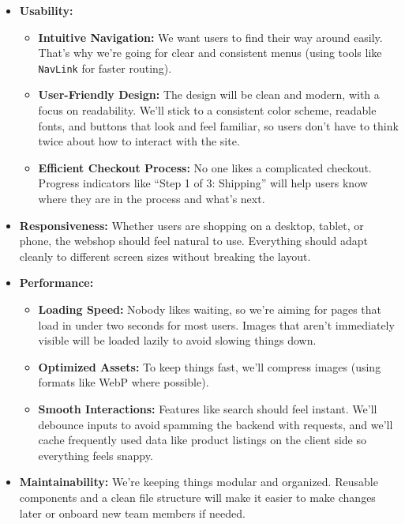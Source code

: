 \documentclass[a4paper,12pt]{article}
\begin{document}
\begin{itemize}
    \item \textbf{Usability:}  
    \begin{itemize}
        \item \textbf{Intuitive Navigation:}  
        We want users to find their way around easily. That’s why we’re going for clear and consistent menus (using tools like \texttt{NavLink} for faster routing).

        \item \textbf{User-Friendly Design:}  
        The design will be clean and modern, with a focus on readability. We’ll stick to a consistent color scheme, readable fonts, and buttons that look and feel familiar, so users don’t have to think twice about how to interact with the site.

        \item \textbf{Efficient Checkout Process:}  
        No one likes a complicated checkout. Progress indicators like “Step 1 of 3: Shipping” will help users know where they are in the process and what’s next.
    \end{itemize}

    \item \textbf{Responsiveness:}  
    Whether users are shopping on a desktop, tablet, or phone, the webshop should feel natural to use. Everything should adapt cleanly to different screen sizes without breaking the layout.

    \item \textbf{Performance:}  
    \begin{itemize}
        \item \textbf{Loading Speed:}  
        Nobody likes waiting, so we’re aiming for pages that load in under two seconds for most users. Images that aren’t immediately visible will be loaded lazily to avoid slowing things down.

        \item \textbf{Optimized Assets:}  
        To keep things fast, we’ll compress images (using formats like WebP where possible).

        \item \textbf{Smooth Interactions:}  
        Features like search should feel instant. We'll debounce inputs to avoid spamming the backend with requests, and we’ll cache frequently used data like product listings on the client side so everything feels snappy.
    \end{itemize}

    \item \textbf{Maintainability:}  
    We’re keeping things modular and organized. Reusable components and a clean file structure will make it easier to make changes later or onboard new team members if needed.


\end{itemize}
\end{document}
